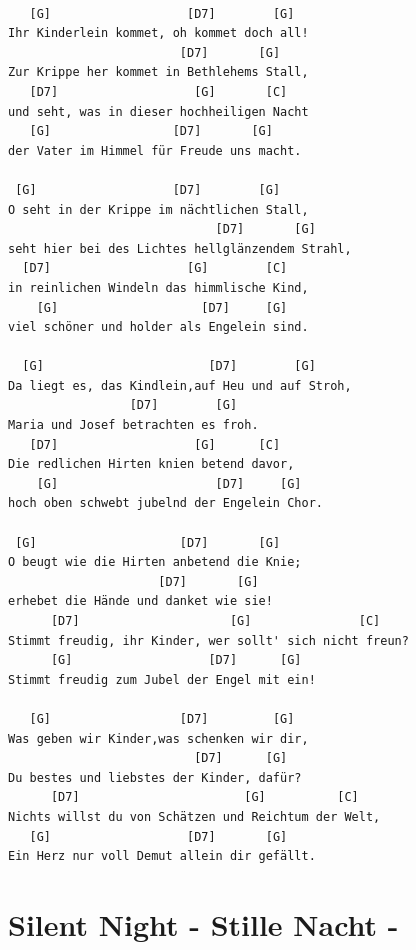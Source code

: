 \documentclass[]{book}
\let\stdsection\section
\renewcommand\section{\clearpage\stdsection}
\begin{document}
\begin{verbatim}

   [G]                   [D7]        [G]    
Ihr Kinderlein kommet, oh kommet doch all!
                        [D7]       [G]    
Zur Krippe her kommet in Bethlehems Stall,
   [D7]                   [G]       [C] 
und seht, was in dieser hochheiligen Nacht
   [G]                 [D7]       [G]  
der Vater im Himmel für Freude uns macht.

 [G]                   [D7]        [G]  
O seht in der Krippe im nächtlichen Stall,
                             [D7]       [G]    
seht hier bei des Lichtes hellglänzendem Strahl,
  [D7]                   [G]        [C]      
in reinlichen Windeln das himmlische Kind,
    [G]                    [D7]     [G] 
viel schöner und holder als Engelein sind.

  [G]                       [D7]        [G]   
Da liegt es, das Kindlein,auf Heu und auf Stroh,
                 [D7]        [G]    
Maria und Josef betrachten es froh.
   [D7]                   [G]      [C]     
Die redlichen Hirten knien betend davor,
    [G]                      [D7]     [G]    
hoch oben schwebt jubelnd der Engelein Chor.

 [G]                    [D7]       [G]   
O beugt wie die Hirten anbetend die Knie;
                     [D7]       [G]    
erhebet die Hände und danket wie sie!
      [D7]                     [G]               [C]     
Stimmt freudig, ihr Kinder, wer sollt' sich nicht freun?
      [G]                   [D7]      [G]        
Stimmt freudig zum Jubel der Engel mit ein!

   [G]                  [D7]         [G]   
Was geben wir Kinder,was schenken wir dir,
                          [D7]      [G]    
Du bestes und liebstes der Kinder, dafür?
      [D7]                       [G]          [C]        
Nichts willst du von Schätzen und Reichtum der Welt,
   [G]                   [D7]       [G]        
Ein Herz nur voll Demut allein dir gefällt.
\end{verbatim}

\hypertarget{silent-night---stille-nacht--}{%
\section{Silent Night - Stille Nacht -}\label{silent-night---stille-nacht--}}
\end{document}
